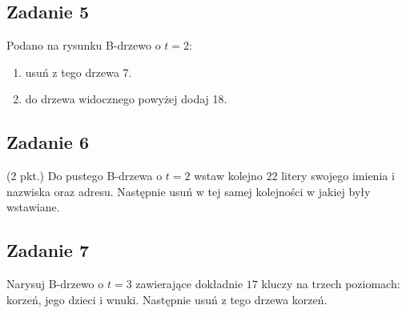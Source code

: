 \documentclass{article}
\begin{document}
\subsection*{Zadanie 5}
Podano na rysunku B-drzewo o $t=2$:
\begin{center}
    \begin{enumerate}[label=-]
        \item usuń z tego drzewa 7.
        \item do drzewa widocznego powyżej dodaj 18.
    \end{enumerate}
\end{center}

\subsection*{Zadanie 6}
(2 pkt.) Do pustego B-drzewa o $t=2$ wstaw kolejno $22$ litery swojego imienia i nazwiska oraz adresu. Następnie usuń w
tej samej kolejności w jakiej były wstawiane.

\subsection*{Zadanie 7}
Narysuj B-drzewo o $t=3$ zawierające dokładnie $17$ kluczy na trzech poziomach: korzeń, jego dzieci i wnuki. Następnie
usuń z tego drzewa korzeń.
\end{document}
